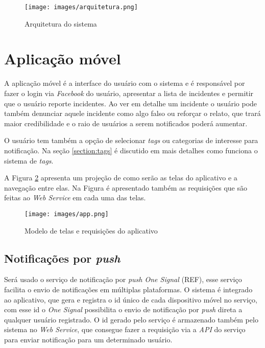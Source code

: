 \documentclass[	12pt, Times, openright, twoside, a4paper, english, brazil]{abntex2}
\begin{document}
\begin{figure}[h]
\centering %
\texttt{[image: images/arquitetura.png]} %
\caption{Arquitetura do sistema}
\label{fig:Arquitetura}
\end{figure}

\section{Aplicação móvel}
A aplicação móvel é a interface do usuário com o sistema e é responsável por fazer o login via \textit{Facebook} do usuário, apresentar a lista de incidentes e permitir que o usuário reporte incidentes. Ao ver em detalhe um incidente o usuário pode também denunciar aquele incidente como algo falso ou reforçar o relato, que trará maior credibilidade e o raio de usuários a serem notificados poderá aumentar.

O usuário tem também a opção de selecionar \textit{tags} ou categorias de interesse para notificação. Na seção \ref{section:tags} é discutido em mais detalhes como funciona o sistema de \textit{tags}.

A Figura \ref{fig:App} apresenta um projeção de como serão as telas do aplicativo e a navegação entre elas. Na Figura é apresentado também as requisições que são feitas ao \textit{Web Service} em cada uma das telas.

\begin{figure}[h]
\centering %
\texttt{[image: images/app.png]} %
\caption{Modelo de telas e requisições do aplicativo}
\label{fig:App}
\end{figure}

\subsection{Notificações por \textit{push}}
Será usado o serviço de notificação por \textit{push One Signal} (REF), esse serviço facilita o envio de notificações em múltiplas plataformas. O sistema é integrado ao aplicativo, que gera e registra o id único de cada dispositivo móvel no serviço, com esse id o \textit{One Signal} possibilita o envio de notificação por \textit{push} direta a qualquer usuário registrado. O id gerado pelo serviço é armazenado também pelo sistema no \textit{Web Service}, que consegue fazer a requisição via a \textit{API} do serviço para enviar notificação para um determinado usuário.
\end{document}

